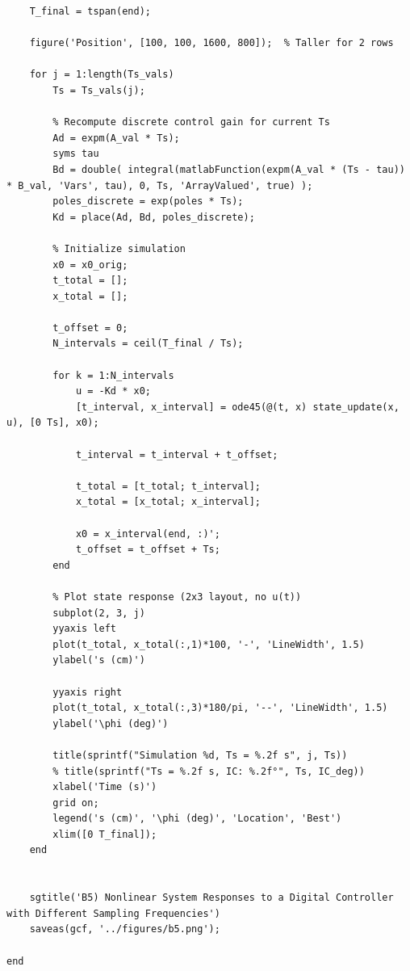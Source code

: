 \documentclass{article}
\begin{document}
\begin{verbatim}
    T_final = tspan(end);

    figure('Position', [100, 100, 1600, 800]);  % Taller for 2 rows

    for j = 1:length(Ts_vals)
        Ts = Ts_vals(j);

        % Recompute discrete control gain for current Ts
        Ad = expm(A_val * Ts);
        syms tau
        Bd = double( integral(matlabFunction(expm(A_val * (Ts - tau)) * B_val, 'Vars', tau), 0, Ts, 'ArrayValued', true) );
        poles_discrete = exp(poles * Ts);
        Kd = place(Ad, Bd, poles_discrete);

        % Initialize simulation
        x0 = x0_orig;
        t_total = [];
        x_total = [];

        t_offset = 0;
        N_intervals = ceil(T_final / Ts);

        for k = 1:N_intervals
            u = -Kd * x0;
            [t_interval, x_interval] = ode45(@(t, x) state_update(x, u), [0 Ts], x0);

            t_interval = t_interval + t_offset;

            t_total = [t_total; t_interval];
            x_total = [x_total; x_interval];

            x0 = x_interval(end, :)';
            t_offset = t_offset + Ts;
        end

        % Plot state response (2x3 layout, no u(t))
        subplot(2, 3, j)
        yyaxis left
        plot(t_total, x_total(:,1)*100, '-', 'LineWidth', 1.5)
        ylabel('s (cm)')

        yyaxis right
        plot(t_total, x_total(:,3)*180/pi, '--', 'LineWidth', 1.5)
        ylabel('\phi (deg)')
        
        title(sprintf("Simulation %d, Ts = %.2f s", j, Ts))
        % title(sprintf("Ts = %.2f s, IC: %.2f°", Ts, IC_deg))
        xlabel('Time (s)')
        grid on;
        legend('s (cm)', '\phi (deg)', 'Location', 'Best')
        xlim([0 T_final]);
    end


    sgtitle('B5) Nonlinear System Responses to a Digital Controller with Different Sampling Frequencies')
    saveas(gcf, '../figures/b5.png');

end


\end{verbatim}
\end{document}
